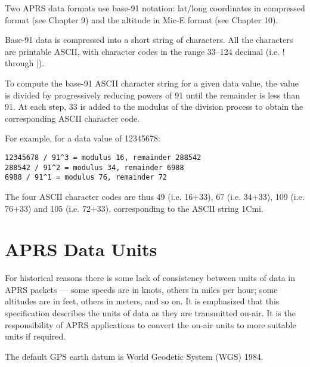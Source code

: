 Two APRS data formats use base-91 notation: lat/long coordinates in
compressed format (see Chapter 9) and the altitude in Mic-E format (see
Chapter 10).

Base-91 data is compressed into a short string of characters. All the
characters are printable ASCII, with character codes in the range 33–124
decimal (i.e. ! through |).

To compute the base-91 ASCII character string for a given data value, the
value is divided by progressively reducing powers of 91 until the remainder
is less than 91. At each step, 33 is added to the modulus of the division
process to obtain the corresponding ASCII character code.

For example, for a data value of 12345678:
\begin{verbatim}
12345678 / 91^3 = modulus 16, remainder 288542
288542 / 91^2 = modulus 34, remainder 6988
6988 / 91^1 = modulus 76, remainder 72
\end{verbatim}

The four ASCII character codes are thus 49 (i.e. 16+33), 67 (i.e. 34+33), 109
(i.e. 76+33) and 105 (i.e. 72+33), corresponding to the ASCII string 1Cmi.

\section{APRS Data Units}

For historical reasons there is some lack of consistency between units of data
in APRS packets — some speeds are in knots, others in miles per hour; some
altitudes are in feet, others in meters, and so on. It is emphasized that this
specification describes the units of data as they are transmitted on-air. It is
the responsibility of APRS applications to convert the on-air units to more
suitable units if required.

The default GPS earth datum is World Geodetic System (WGS) 1984.


